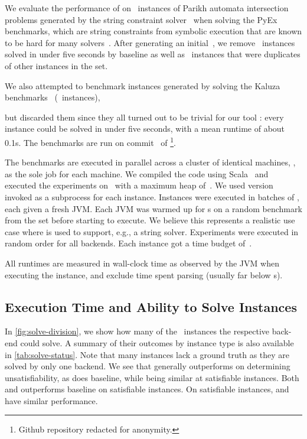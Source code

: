 
We evaluate the performance of \Catra{} on~\NrBenchmarks{} instances of Parikh
automata intersection problems generated by the \OstrichPlus{} string constraint
solver~\cite{ostrich-plus} when solving the PyEx benchmarks, 
which are string constraints from symbolic execution that are known
to be hard for many solvers~\cite{pyex}. After generating an
initial~\InitialNrBenchmarks{}, we remove~\NrTrivial{} instances solved in under
five seconds by baseline as well as~\NrInvalid{} instances that were duplicates of other instances in the set.

 We also attempted to benchmark instances generated by
\OstrichPlus{} solving the Kaluza benchmarks~\cite{Saxena10:kaluza}
(~instances),
\iffalse
and pyex-len
(\numprint{791}~instances) benchmark suites\fi
but discarded them since they all turned out to be trivial for our tool
\Catra{}: every instance
could be solved in under five seconds, with a mean runtime of about 0.1s.
The benchmarks are run
on commit~\texttt{\commit} of \Catra{}\footnote{Github repository redacted for anonymity.}.

The benchmarks are executed in parallel across a cluster of identical
machines, \BenchmarkRig{}, as the sole job for each machine.  We compiled
the code using Scala~\ScalaVersion{} and executed the experiments
on~\JvmVersion{} with a maximum heap of~\MaxHeapSize{}. We used \Nuxmv{}
version~\NuxmvVersion{} invoked as a subprocess for each instance. Instances
were executed in batches of \BatchSize{}, each given a fresh JVM. Each JVM was
warmed up for s on a random benchmark from the set before starting
to execute. We believe this represents a realistic use case where \Calculus{} is
used to support, e.g., a string solver. Experiments were executed in random order
for all backends. Each instance got a time budget of~\RuntimeTimeout.

All runtimes are measured in wall-clock time as observed by the JVM when
executing the instance, and exclude time spent parsing (usually far below
s).

\subsection{Execution Time and Ability to Solve Instances}\label{sec:runtime}

In \cref{fig:solve-division}, we show how many of the~\NrBenchmarks{} instances
the respective back-end could solve. A summary of their outcomes by instance
type is also available in \cref{tab:solve-status}. Note that many instances lack
a ground truth as they are solved by only one backend. We see that
\Calculus{} generally outperforms \Nuxmv{} on determining unsatisfiability, as
does baseline, while being similar at satisfiable instances. Both \Calculus{} and
\Nuxmv{} outperforms baseline on satisfiable instances. On satisfiable
instances, \Nuxmv{} and \Calculus{} have similar performance.

